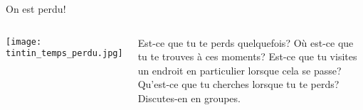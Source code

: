 \begin{frame}{On est perdu!}
  \begin{columns}
      \begin{center}
        \texttt{[image: tintin\_temps\_perdu.jpg]}
      \end{center}
      Est-ce que \alert{tu te perds} quelquefois?
      Où est-ce que \alert{tu te trouves} à ces moments? 
      Est-ce que \alert{tu visites} un endroit en particulier lorsque cela se passe?
      Qu'est-ce que \alert{tu cherches} lorsque tu te perds?
      Discutes-en en groupes.
  \end{columns}
\end{frame}